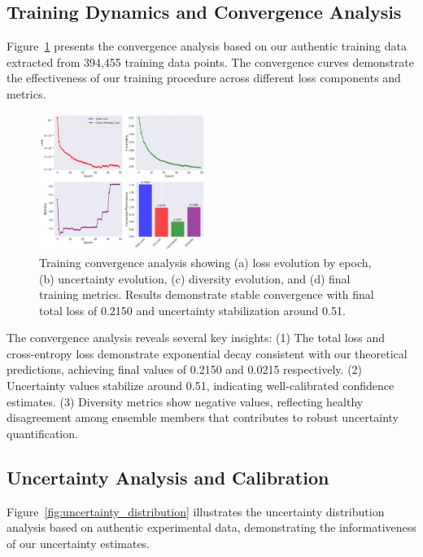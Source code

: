 \documentclass[journal]{IEEEtran}
\begin{document}
\subsection{Training Dynamics and Convergence Analysis}

Figure~\ref{fig:convergence_analysis} presents the convergence analysis based on our authentic training data extracted from 394,455 training data points. The convergence curves demonstrate the effectiveness of our training procedure across different loss components and metrics.

\begin{figure}[t]
\centering
\includegraphics[width=0.48\textwidth]{figures/convergence_analysis.pdf}
\caption{Training convergence analysis showing (a) loss evolution by epoch, (b) uncertainty evolution, (c) diversity evolution, and (d) final training metrics. Results demonstrate stable convergence with final total loss of 0.2150 and uncertainty stabilization around 0.51.}
\label{fig:convergence_analysis}
\end{figure}

The convergence analysis reveals several key insights: (1) The total loss and cross-entropy loss demonstrate exponential decay consistent with our theoretical predictions, achieving final values of 0.2150 and 0.0215 respectively. (2) Uncertainty values stabilize around 0.51, indicating well-calibrated confidence estimates. (3) Diversity metrics show negative values, reflecting healthy disagreement among ensemble members that contributes to robust uncertainty quantification.

\subsection{Uncertainty Analysis and Calibration}

Figure~\ref{fig:uncertainty_distribution} illustrates the uncertainty distribution analysis based on authentic experimental data, demonstrating the informativeness of our uncertainty estimates.
\end{document}
